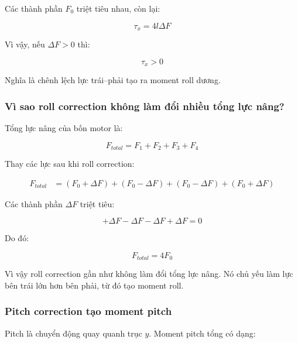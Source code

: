 Các thành phần $F_0$ triệt tiêu nhau, còn lại:

\begin{equation}
    \tau_x = 4l\Delta F
\end{equation}

Vì vậy, nếu $\Delta F>0$ thì:

\begin{equation}
    \tau_x > 0
\end{equation}

Nghĩa là chênh lệch lực trái--phải tạo ra moment roll dương.

\subsubsection{Vì sao roll correction không làm đổi nhiều tổng lực nâng?}

Tổng lực nâng của bốn motor là:

\begin{equation}
    F_{total}
    =
    F_1 + F_2 + F_3 + F_4
\end{equation}

Thay các lực sau khi roll correction:

\begin{equation}
\begin{aligned}
    F_{total}
    &=
    (F_0+\Delta F)
    +(F_0-\Delta F)
    +(F_0-\Delta F)
    +(F_0+\Delta F)
\end{aligned}
\end{equation}

Các thành phần $\Delta F$ triệt tiêu:

\begin{equation}
    +\Delta F-\Delta F-\Delta F+\Delta F=0
\end{equation}

Do đó:

\begin{equation}
    F_{total}=4F_0
\end{equation}

Vì vậy roll correction gần như không làm đổi tổng lực nâng. Nó chủ yếu làm lực
bên trái lớn hơn bên phải, từ đó tạo moment roll.

\subsubsection{Pitch correction tạo moment pitch}

Pitch là chuyển động quay quanh trục $y$. Moment pitch tổng có dạng:

